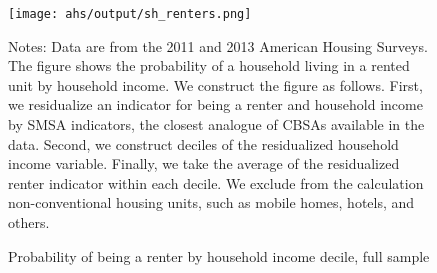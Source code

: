 \begin{figure}[h!]
    \centering
    \caption{Probability of being a renter by household income decile,
             full sample}
    \label{fig:ahs_pr_renters}

    \texttt{[image: ahs/output/sh\_renters.png]}

    \begin{minipage}{.95\textwidth} \footnotesize
        \vspace{3mm}
        Notes: Data are from the 2011 and 2013 American Housing Surveys.
        The figure shows the probability of a household living in a
        rented unit by household income. 
        We construct the figure as follows.
        First, we residualize an indicator for being a renter and 
        household income by SMSA indicators, the closest analogue of CBSAs 
        available in the data.
        Second, we construct deciles of the residualized household
        income variable.
        Finally, we take the average of the residualized renter 
        indicator within each decile.
        We exclude from the calculation non-conventional housing units, 
        such as mobile homes, hotels, and others.
    \end{minipage}
\end{figure}

